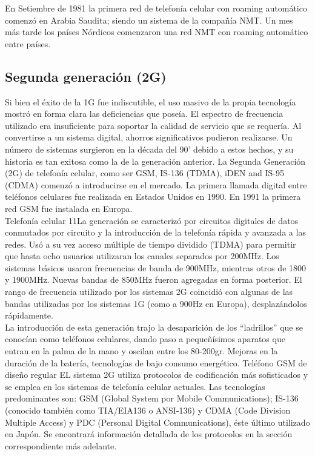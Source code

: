 \documentclass[]{article}
\begin{document}
En Setiembre de 1981 la primera red de telefonía celular con roaming automático
comenzó en Arabia Saudita; siendo un sistema de la compañía NMT. Un mes más
tarde los países Nórdicos comenzaron una red NMT con roaming automático entre
países.\\

\subsection{Segunda generación (2G)}

Si bien el éxito de la 1G fue indiscutible, el uso masivo de la propia tecnología
mostró en forma clara las deficiencias que poseía. El espectro de frecuencia
utilizado era insuficiente para soportar la calidad de servicio que se requería. Al
convertirse a un sistema digital, ahorros significativos pudieron realizarse. Un
número de sistemas surgieron en la década del 90’ debido a estos hechos, y su
historia es tan exitosa como la de la generación anterior. La Segunda Generación
(2G) de telefonía celular, como ser GSM, IS-136 (TDMA), iDEN and IS-95 (CDMA)
comenzó a introducirse en el mercado.
La primera llamada digital entre teléfonos celulares fue realizada en Estados
Unidos en 1990. En 1991 la primera red GSM fue instalada en Europa.\\

Telefonía celular
11La generación se caracterizó por circuitos digitales de datos conmutados por
circuito y la introducción de la telefonía rápida y avanzada a las redes. Usó a su
vez acceso múltiple de tiempo dividido (TDMA) para permitir que hasta ocho
usuarios utilizaran los canales separados por 200MHz. Los sistemas básicos usaron
frecuencias de banda de 900MHz, mientras otros de 1800 y 1900MHz. Nuevas
bandas de 850MHz fueron agregadas en forma posterior. El rango de frecuencia
utilizado por los sistemas 2G coincidió con algunas de las bandas utilizadas por los
sistemas 1G (como a 900Hz en Europa), desplazándolos rápidamente.\\

La introducción de esta generación trajo la desaparición de los “ladrillos” que se
conocían como teléfonos celulares, dando paso a pequeñísimos aparatos que
entran en la palma de la mano y oscilan entre los 80-200gr. Mejoras en la duración
de la batería, tecnologías de bajo consumo energético.
Teléfono GSM de diseño regular
EL sistema 2G utiliza protocolos de codificación más sofisticados y se emplea en
los sistemas de telefonía celular actuales. Las tecnologías predominantes son: GSM
(Global System por Mobile Communications); IS-136 (conocido también como
TIA/EIA136 o ANSI-136) y CDMA (Code Division Multiple Access) y PDC
(Personal Digital Communications), éste último utilizado en Japón. Se encontrará
información detallada de los protocolos en la sección correspondiente más
adelante.\\
\end{document}
